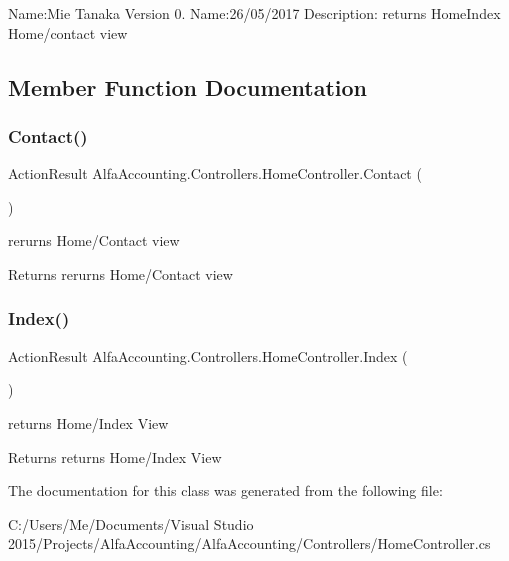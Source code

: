 Name\+:Mie Tanaka Version 0. Name\+:26/05/2017 Description\+: returns Home\+Index Home/contact view 

\subsection{Member Function Documentation}
\mbox{\label{class_alfa_accounting_1_1_controllers_1_1_home_controller_aeb7c1282acbfe22ed6a6d268f70be973}} 
\subsubsection{\texorpdfstring{Contact()}{Contact()}}
{\footnotesize\ttfamily Action\+Result Alfa\+Accounting.\+Controllers.\+Home\+Controller.\+Contact (\begin{DoxyParamCaption}{ }\end{DoxyParamCaption})}



rerurns Home/\+Contact view 

\begin{DoxyReturn}{Returns}
rerurns Home/\+Contact view
\end{DoxyReturn}
\mbox{\label{class_alfa_accounting_1_1_controllers_1_1_home_controller_a1c6b240848a9e77a0352a88de2811e5b}} 
\subsubsection{\texorpdfstring{Index()}{Index()}}
{\footnotesize\ttfamily Action\+Result Alfa\+Accounting.\+Controllers.\+Home\+Controller.\+Index (\begin{DoxyParamCaption}{ }\end{DoxyParamCaption})}



returns Home/\+Index View 

\begin{DoxyReturn}{Returns}
returns Home/\+Index View
\end{DoxyReturn}


The documentation for this class was generated from the following file\+:\begin{DoxyCompactItemize}
\item 
C\+:/\+Users/\+Me/\+Documents/\+Visual Studio 2015/\+Projects/\+Alfa\+Accounting/\+Alfa\+Accounting/\+Controllers/Home\+Controller.\+cs\end{DoxyCompactItemize}
